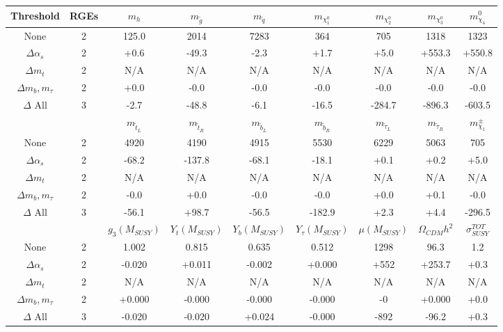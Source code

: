 \begin{table}
\begin{center}
\begin{tabular}{|c|c|ccccccc|}\hline
Threshold & RGEs  & $m_h$  & $m_{\tilde g}$ & $m_{{\tilde q}}$ & $m_{\chi_1^0}$  & $m_{\chi_2^0}$ & $m_{\chi_3^0}$ & $m_{\chi_4}^0$ \\ \hline
None               & 2 & 125.0 & 2014 & 7283 &  364 &  705 & 1318 &1323\\
$\Delta \alpha_s$  & 2 &  +0.6 & -49.3 &  -2.3 &  +1.7 &  +5.0 & +553.3 &+550.8\\
$\Delta m_t$      & 2 & N/A & N/A & N/A & N/A & N/A & N/A & N/A  \\
$\Delta m_b, m_\tau$& 2 &  +0.0 &  -0.0 &  -0.0 &  -0.0 &  -0.0 &  -0.0 & -0.0\\
$\Delta$ All      & 3 &  -2.7 & -48.8 &  -6.1 & -16.5 & -284.7 & -896.3 &-603.5\\

%
\hline&& $m_{{\tilde t}_L}$  & $m_{{\tilde t}_R}$ &$m_{{\tilde b}_L}$&$m_{{\tilde b}_R}$&$m_{{\tilde \tau}_L}$&$m_{{\tilde \tau}_R}$&$m_{\chi_1}^\pm$ \\ \hline
None             & 2 &4920 & 4190 & 4915 & 5530 & 6229 & 5063 & 705\\
$\Delta \alpha_s$  & 2 & -68.2 & -137.8 & -68.1 & -18.1 &  +0.1 &  +0.2 & +5.0\\
$\Delta m_t$      & 2 & N/A & N/A & N/A & N/A & N/A & N/A & N/A \\
$\Delta m_b, m_\tau$& 2 &  -0.0 &  +0.0 &  -0.0 &  -0.0 &  +0.0 &  +0.1 & -0.0\\
$\Delta$ All      & 3 & -56.1 & +98.7 & -56.5 & -182.9 &  +2.3 &  +4.4 &-296.5\\

%
\hline      &  & $g_3(M_{SUSY})$ & $Y_t(M_{SUSY})$ &  $Y_b(M_{SUSY})$ & $Y_\tau(M_{SUSY})$  & $\mu(M_{SUSY})$    & $\Omega_{CDM} h^2$ & $\sigma_{SUSY}^{TOT}$\\ \hline
 None                   & 2 & 1.002 & 0.815 & 0.635 & 0.512 & 1298 &  96.3 &   1.2\\
$\Delta \alpha_s$  & 2 & -0.020 & +0.011 & -0.002 & +0.000 & +552 & +253.7 &  +0.3\\
$\Delta m_t$      & 2 & N/A & N/A & N/A & N/A & N/A & N/A& N/A\\
$\Delta m_b, m_\tau$& 2 & +0.000 & -0.000 & -0.000 & -0.000 &   -0 & +0.000 &  +0.0\\
$\Delta$ All      & 3 & -0.020 & -0.020 & +0.024 & -0.000 & -892 & -96.2 & +0.3\\


\end{tabular}
\end{center}
\end{table}
